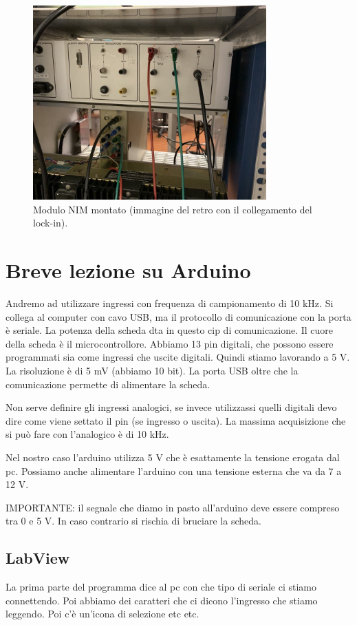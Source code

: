 \documentclass[../main/main.tex]{subfiles}
\begin{document}
\begin{figure}[h!]
\centering
\includegraphics[width=0.8\textwidth]{../lessons/image/10/2.jpg}
\caption{\label{fig:10_2} Modulo NIM montato (immagine del retro con il collegamento del lock-in).}
\end{figure}



\clearpage

\section{Breve lezione su Arduino}

Andremo ad utilizzare ingressi con frequenza di campionamento di 10 kHz. Si collega al computer con cavo USB, ma il protocollo di comunicazione con la porta è seriale. La potenza della scheda dta in questo cip di comunicazione.
Il cuore della scheda è il microcontrollore. Abbiamo 13 pin digitali, che possono essere programmati sia come ingressi che uscite digitali. Quindi stiamo lavorando a 5 V. La risoluzione è di 5 mV (abbiamo 10 bit). La porta USB oltre che la comunicazione permette di alimentare la scheda.

Non serve definire gli ingressi analogici, se invece utilizzassi quelli digitali devo dire come viene settato il pin (se ingresso o uscita).
La massima acquisizione che si può fare con l'analogico è di 10 kHz.

Nel nostro caso l'arduino utilizza 5 V che è esattamente la tensione erogata dal pc. Possiamo anche alimentare l'arduino con una tensione esterna che va da 7 a 12 V.

\begin{remark}
IMPORTANTE: il segnale che diamo in pasto all'arduino deve essere compreso tra 0 e 5 V. In caso contrario si rischia di bruciare la scheda.
\end{remark}


\subsection{LabView}
La prima parte del programma dice al pc con che tipo di seriale ci stiamo connettendo. Poi abbiamo dei caratteri che ci dicono l'ingresso che stiamo leggendo. Poi c'è un'icona di selezione etc etc.
\end{document}
